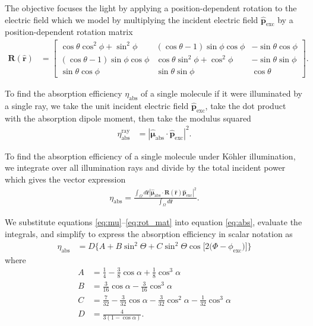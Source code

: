 \documentclass[10pt]{article}
\providecommand{\mb}[1]{\mathbf{#1}}
\providecommand{\mh}[1]{\mathbf{\hat{#1}}}
\providecommand{\bs}[1]{\boldsymbol{#1}}
\begin{document}
  The objective focuses the light by applying a position-dependent rotation to
  the electric field which we model by multiplying the incident electric field
  $\hat{\mb{p}}_{\text{exc}}$ by a position-dependent rotation matrix
  \begin{align}
  \mb{R}(\mh{r}) &= \begin{bmatrix} \cos\theta\cos^2\phi + \sin^2\phi & (\cos\theta -1)\sin\phi\cos\phi & -\sin\theta\cos\phi\\ (\cos\theta - 1)\sin\phi\cos\phi & \cos\theta\sin^2\phi + \cos^2\phi & -\sin\theta\sin\phi \\ \sin\theta\cos\phi& \sin\theta\sin\phi & \cos\theta \end{bmatrix} \label{eq:rot_mat}.
  \end{align}

  To find the absorption efficiency $\eta_{\text{abs}}$ of a single molecule if
  it were illuminated by a single ray, we take the unit incident electric field
  $\hat{\mb{p}}_{\text{exc}}$, take the dot product with the absorption dipole
  moment, then take the modulus squared
    \begin{align}
      \eta_{\text{abs}}^{\text{ray}} &= |\hat{\bs{\mu}}_{\text{abs}}\cdot\mh{p}_{\text{exc}}|^2. \label{eq:singleray}
    \end{align}

    To find the absorption efficiency of a single molecule under K\"ohler
    illumination, we integrate over all illumination rays and divide by the
    total incident power which gives the vector expression
\begin{align}
  \eta_{\text{abs}} = \frac{\int_{\Omega}d\mh{r}|\hat{\bs{\mu}}_{\text{abs}}\cdot\mb{R}(\mh{r})\mh{p}_{\text{exc}}|^2}{\int_{\Omega}d\mh{r}}\label{eq:abs}. 
\end{align}

We substitute equations \ref{eq:mu}--\ref{eq:rot_mat} into equation
\ref{eq:abs}, evaluate the integrals, and simplify to express the absorption
efficiency in scalar notation as
\begin{align}
  \eta_{\text{abs}} &= D\{A + B\sin^{2}{\Theta} + C\sin^{2}{\Theta} \cos{[2 (\Phi - \phi_{\text{exc}}})]\}\label{eq:scalarabs}
\end{align}
where
\begin{subequations}
\begin{align}
  A &= \frac{1}{4} - \frac{3}{8} \cos{\alpha } + \frac{1}{8} \cos^{3}{\alpha }\\
  B &= \frac{3}{16} \cos{\alpha } - \frac{3}{16} \cos^{3}{\alpha }\\
  C &= \frac{7}{32} - \frac{3}{32} \cos{\alpha } - \frac{3}{32} \cos^{2}{\alpha } - \frac{1}{32} \cos^{3}{\alpha}\\
  D &= \frac{4}{3(1 - \cos\alpha)}.
\end{align}\label{eq:coefficients}%
\end{subequations}
\end{document}
